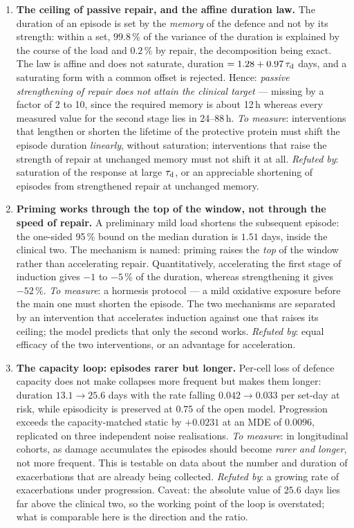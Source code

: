 \begin{enumerate}[leftmargin=1.5em,itemsep=4pt]
\item \textbf{The ceiling of passive repair, and the affine duration law.} The duration of an episode is set by the \emph{memory} of the defence and not by its strength: within a set, $99.8\,\%$ of the variance of the duration is explained by the course of the load and $0.2\,\%$ by repair, the decomposition being exact. The law is affine and does not saturate, duration $=1.28+0.97\,\tau_{\rm d}$ days, and a saturating form with a common offset is rejected. Hence: \emph{passive strengthening of repair does not attain the clinical target} --- missing by a factor of 2 to 10, since the required memory is about 12\,h whereas every measured value for the second stage lies in 24--88\,h. \emph{To measure}: interventions that lengthen or shorten the lifetime of the protective protein must shift the episode duration \emph{linearly}, without saturation; interventions that raise the strength of repair at unchanged memory must not shift it at all. \emph{Refuted by}: saturation of the response at large $\tau_{\rm d}$, or an appreciable shortening of episodes from strengthened repair at unchanged memory.

\item \textbf{Priming works through the top of the window, not through the speed of repair.} A preliminary mild load shortens the subsequent episode: the one-sided 95\,\% bound on the median duration is $1.51$ days, inside the clinical two. The mechanism is named: priming raises the \emph{top} of the window rather than accelerating repair. Quantitatively, accelerating the first stage of induction gives $-1$ to $-5\,\%$ of the duration, whereas strengthening it gives $-52\,\%$. \emph{To measure}: a hormesis protocol --- a mild oxidative exposure before the main one must shorten the episode. The two mechanisms are separated by an intervention that accelerates induction against one that raises its ceiling; the model predicts that only the second works. \emph{Refuted by}: equal efficacy of the two interventions, or an advantage for acceleration.

\item \textbf{The capacity loop: episodes rarer but longer.} Per-cell loss of defence capacity does not make collapses more frequent but makes them longer: duration $13.1\to25.6$ days with the rate falling $0.042\to0.033$ per set-day at risk, while episodicity is preserved at $0.75$ of the open model. Progression exceeds the capacity-matched static by $+0.0231$ at an MDE of $0.0096$, replicated on three independent noise realisations. \emph{To measure}: in longitudinal cohorts, as damage accumulates the episodes should become \emph{rarer and longer}, not more frequent. This is testable on data about the number and duration of exacerbations that are already being collected. \emph{Refuted by}: a growing rate of exacerbations under progression. Caveat: the absolute value of $25.6$ days lies far above the clinical two, so the working point of the loop is overstated; what is comparable here is the direction and the ratio.


\end{enumerate}

